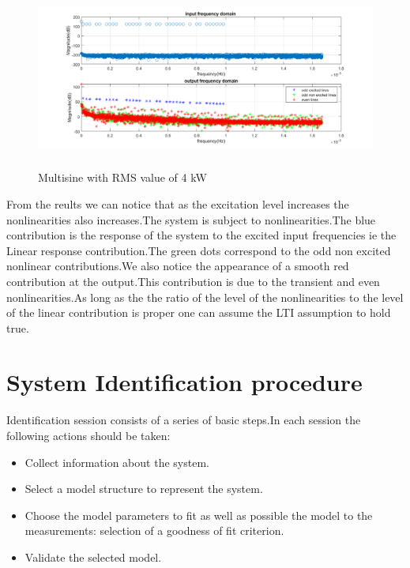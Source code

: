 \documentclass[a4paper,12pt]{report}
\numberwithin{equation}{section}
\begin{document}
\begin{figure}[H]
    \includegraphics[width=\textwidth, height=6cm]{MS_4kw.png}
    \centering
    \caption{Multisine with RMS value of 4 kW}
    \label{fig:MS_4.0}
\end{figure}

From the reults we can notice that as the excitation level increases the nonlinearities also increases.The system is subject to nonlinearities.The blue contribution is the response of the system to the excited input frequencies ie the Linear response contribution.The green dots correspond to the odd non excited nonlinear contributions.We also notice the appearance of a smooth red contribution at the output.This contribution is due to the transient and even nonlinearities.As long as the the ratio of the level of the nonlinearities to the level of the linear contribution is proper one can assume the LTI assumption to hold true.




\section{System Identification procedure}
Identification session consists of a series of basic steps.In each session the following actions should be taken:
\begin{itemize}
    \item Collect information about the system.
    \item Select a model structure to represent the system.
    \item Choose the model parameters to fit as well as possible the model to the measurements:
selection of a goodness of fit criterion.
     \item Validate the selected model.
\end{itemize}
\end{document}
